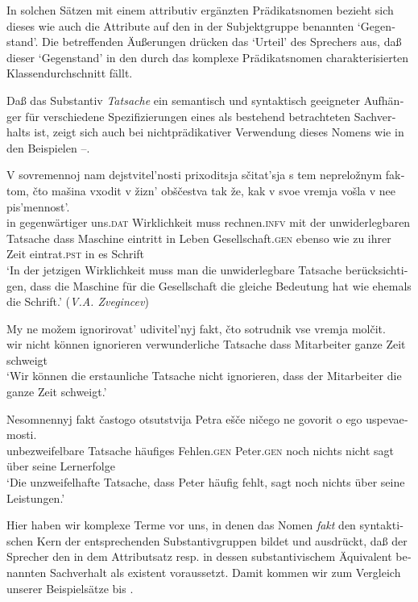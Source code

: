 \documentclass[output=paper]{langscibook}
\begin{document}
\begin{otherlanguage}{german}
In solchen Sätzen mit einem attributiv ergänzten Prädikatsnomen bezieht sich dieses wie auch die Attribute auf den in der Subjektgruppe benannten ‘Gegenstand’. Die betreffenden Äußerungen drücken das ‘Urteil’ des Sprechers aus, daß dieser ‘Gegenstand’ in den durch das komplexe Prädikatsnomen charakterisierten Klassendurchschnitt fällt.

Daß das Substantiv \textit{Tatsache} ein semantisch und syntaktisch geeigneter Auf\-hän\-ger für verschiedene Spezifizierungen eines als bestehend betrachteten Sach\-ver\-halts ist, zeigt sich auch bei nichtprädikativer Verwendung dieses Nomens wie in den Beispielen --.

\ea \label{ex:zi83:39}
    \gll V sovremennoj nam dejstvitel’nosti prixoditsja sčitat’sja s tem nepreložnym faktom, čto mašina vxodit v žizn’ obščestva {tak že}, kak v svoe vremja vošla v nee pis’mennost’. \\
    in gegenwärtiger uns.\textsc{dat}  Wirklichkeit muss rechnen.\textsc{infv} mit der unwiderlegbaren Tatsache dass  Maschine eintritt in  Leben  Gesellschaft.\textsc{gen} ebenso wie zu ihrer Zeit eintrat.\textsc{pst} in es  Schrift \\
    \glt ‘In der jetzigen Wirklichkeit muss man die unwiderlegbare Tatsache berücksichtigen, dass die Maschine für die Gesellschaft die gleiche Bedeutung hat wie ehemals die Schrift.’ (\textit{V.A. Zvegincev})

\newpage
\ex \label{ex:zi83:40}
    \gll My ne možem ignorirovat’ udivitel’nyj fakt, čto sotrudnik vse vremja molčit. \\
    wir nicht können ignorieren  verwunderliche Tatsache dass  Mitarbeiter ganze Zeit schweigt \\
    \glt ‘Wir können die erstaunliche Tatsache nicht ignorieren, dass der Mitarbeiter die ganze Zeit schweigt.’
    
\ex \label{ex:zi83:41}
    \gll Nesomnennyj fakt častogo otsutstvija Petra ešče ničego ne govorit o ego uspevaemosti. \\
     unbezweifelbare Tatsache  häufiges Fehlen.\textsc{gen} Peter.\textsc{gen} noch nichts nicht sagt über seine Lernerfolge \\
    \glt ‘Die unzweifelhafte Tatsache, dass Peter häufig fehlt, sagt noch nichts über seine Leistungen.’

\z

\noindent Hier haben wir komplexe Terme vor uns, in denen das Nomen \textit{fakt} den syntakti\-schen Kern der entsprechenden Substantivgruppen bildet und ausdrückt, daß der Sprecher den in dem Attributsatz resp. in dessen substantivischem Äqui\-valent benannten Sachverhalt als existent voraussetzt. Damit kommen wir zum Ver\-gleich unserer Beispielsätze  bis .


\end{otherlanguage}
\end{document}
